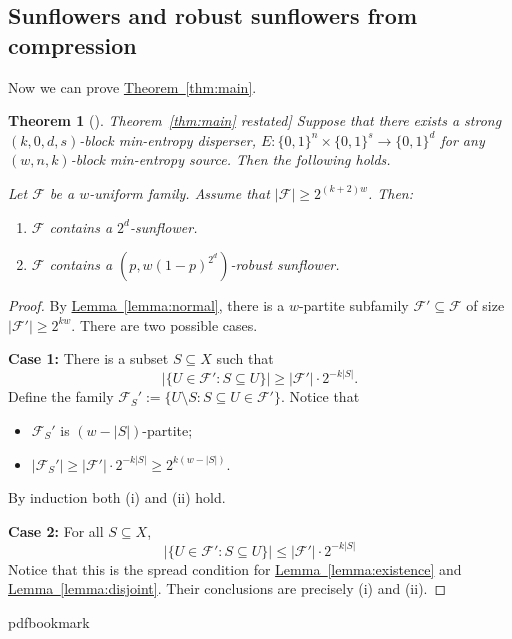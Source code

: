 \documentclass[11pt]{article}
\numberwithin{equation}{section}
\newtheorem{theorem}{Theorem}[section]
\theoremstyle{definition}
\theoremstyle{plain}
\newcommand{\expref}[2]{\hyperref[#2]{#1~\ref{#2}}}
\newcommand{\calF}{\mathcal{F}} %
\begin{document}
\subsection{Sunflowers and robust sunflowers from compression}

Now we can prove \expref{Theorem}{thm:main}.

%
\begin{theorem}[\expref{Theorem}{thm:main} restated]
Suppose that there exists a
strong $(k,0,d,s)$-block min-entropy disperser,
$E:\{0,1\}^{n}\times\{0,1\}^{s}\rightarrow\{0,1\}^{d}$ for any
$(w, n, k)$-block min-entropy source. Then the following holds.

Let $\calF$ be a %
$w$-uniform family.
Assume that $|\calF| \geq 2^{(k+2)  w}$. Then:
\begin{enumerate}
\item[(i)] $\calF$ contains a $2^d$-sunflower.
\item[(ii)] $\calF$ contains a
 $\left(p, w (1-p)^{2^{d}}\right)$-robust sunflower.
\end{enumerate}  %
\end{theorem}  %

\begin{proof}
By \expref{Lemma}{lemma:normal}, there is a %
$w$-partite  %
%
subfamily   %
$\calF'\subseteq\calF$ of size $|\calF'|\geq2^{k w}$.
There are two possible cases.

\noindent  %
\textbf{Case 1:} There is a subset $S\subseteq X$ such that
$$
|\{U\in\calF': S\subseteq U\}|\geq |\calF'|\cdot 2^{-k |S|}.
$$
Define the family $\calF_{S}':=\{U\setminus S: S\subseteq U\in\calF'\}$. Notice that
\begin{itemize}
\item $\calF_{S}'$ is %
   $(w-|S|)$-partite;
\item $|\calF_{S}'|\geq  |\calF'|\cdot 2^{-k |S|}  \geq 2^{k (w-|S|)}.$
\end{itemize}
By induction both (i) and (ii) hold.

\noindent  %
\textbf{Case 2:} For all $S\subseteq X$,
$$
|\{U\in\calF': S\subseteq U\}|\leq |\calF'|\cdot 2^{-k |S|}
$$
Notice that this is the spread condition for \expref{Lemma}{lemma:existence} and
\expref{Lemma}{lemma:disjoint}. Their conclusions are precisely (i) and (ii).
\end{proof}

\newcommand{\prelim}{Preliminary version in\ }\newcommand{\prelims}{Preliminary
  versions in\ }
\providecommand{\bibhead}[1]{}
\expandafter\ifx\csname pdfbookmark\endcsname\relax%
  \providecommand{\tocrefpdfbookmark}{}
\else\providecommand{\tocrefpdfbookmark}{%
   \hypertarget{tocreferences}{}%
   \pdfbookmark[1]{References}{tocreferences}}%
\fi
\end{document}

